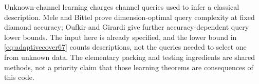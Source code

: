 Unknown-channel learning charges channel queries used to infer a
classical description. Mele and Bittel \cite[Theorem~I.1]{MB67}
prove dimension-optimal query complexity at fixed diamond accuracy;
Oufkir and Girardi \cite{OG67} give further accuracy-dependent query
lower bounds. The input here is already specified, and the lower bound
in \eqref{eq:adaptivecover67} counts descriptions, not the queries
needed to select one from unknown data. The elementary packing and
testing ingredients are shared methods, not a priority claim that
those learning theorems are consequences of this code.
